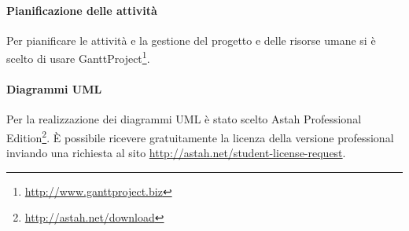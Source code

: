 \paragraph{Pianificazione delle attività}
Per pianificare le attività e la gestione del progetto e delle risorse umane si è scelto di usare \gls{GanttProject}\footnote{\url{http://www.ganttproject.biz}}.

\paragraph{Diagrammi UML}

Per la realizzazione dei diagrammi \gls{UML} è stato scelto \gls{Astah} Professional Edition\footnote{\url{http://astah.net/download}}.
È possibile ricevere gratuitamente la licenza della versione professional inviando una richiesta al sito \url{http://astah.net/student-license-request}.
